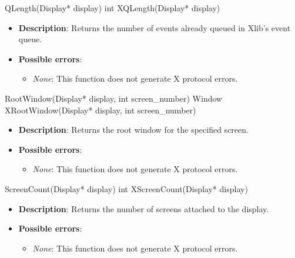 \documentclass{report}
\begin{document}
\begin{itemize}
        \begin{cppcode}
            QLength(Display* display)
            int XQLength(Display* display)
        \end{cppcode}
        \begin{itemize}
            \item \textbf{Description}: Returns the number of events already queued in Xlib's event queue.
            \item \textbf{Possible errors}:
                \begin{itemize}
                    \item \textit{None}: This function does not generate X protocol errors.
                \end{itemize}
        \end{itemize}

        \begin{cppcode}
            RootWindow(Display* display, int screen_number)
            Window XRootWindow(Display* display, int screen_number)
        \end{cppcode}
        \begin{itemize}
            \item \textbf{Description}: Returns the root window for the specified screen.
            \item \textbf{Possible errors}:
                \begin{itemize}
                    \item \textit{None}: This function does not generate X protocol errors.
                \end{itemize}
        \end{itemize}

        \begin{cppcode}
            ScreenCount(Display* display)
            int XScreenCount(Display* display)
        \end{cppcode}
        \begin{itemize}
            \item \textbf{Description}: Returns the number of screens attached to the display.
            \item \textbf{Possible errors}:
                \begin{itemize}
                    \item \textit{None}: This function does not generate X protocol errors.
                \end{itemize}
        \end{itemize}


\end{itemize}
\end{document}
